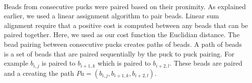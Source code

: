 \documentclass[10pt,a4paper]{article}
\begin{document}
\paragraph{}Beads from consecutive pucks were paired based on their proximity.
As explained earlier, we used a linear assignment algorithm to pair beads.
Linear sum alignment require that a positive cost is computed between any beads that can be paired together.
Here, we used as our cost function the Euclidian distance.
The bead pairing between consecutive pucks creates paths of beads. A path of beads is a set of beads that are paired sequentially by the puck to puck pairing. For example \(b_{i,j}\) is paired to \(b_{i+1,k}\) which is paired to \(b_{i+2,l}\). These beads are paired and a  creating the path \(Pa=(b_{i,j}, b_{i+1,k},b_{i+2,l})\).
\end{document}
